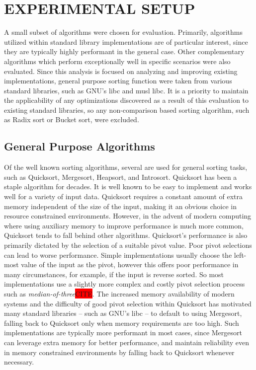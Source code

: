 \documentclass[letter, 12pt, conference]{ieeeconf}
\newcommand{\todocite}{\colorbox{red}{CITE}}
\begin{document}
\section{EXPERIMENTAL SETUP}

A small subset of algorithms were chosen for evaluation. Primarily, algorithms
utilized within standard library implementations are of particular interest,
since they are typically highly performant in the general case. Other
complementary algorithms which perform exceptionally well in specific scenarios
were also evaluated. Since this analysis is focused on analyzing and improving
existing implementations, general purpose sorting function were taken from
various standard libraries, such as GNU's libc\parencite{glibc} and musl
libc\parencite{musl_libc}. It is a priority to maintain the applicability of any
optimizations discovered as a result of this evaluation to existing standard
libraries, so any non-comparison based sorting algorithm, such as Radix sort or
Bucket sort, were excluded.

\subsection{General Purpose Algorithms}

Of the well known sorting algorithms, several are used for general sorting
tasks, such as Quicksort, Mergesort, Heapsort, and Introsort. Quicksort has been
a staple algorithm for decades. It is well known to be easy to implement and
works well for a variety of input data. Quicksort requires a constant amount of
extra memory independent of the size of the input, making it an obvious choice
in resource constrained environments. However, in the advent of modern computing
where using auxiliary memory to improve performance is much more common,
Quicksort tends to fall behind other algorithms. Quicksort's performance is also
primarily dictated by the selection of a suitable pivot value. Poor pivot
selections can lead to worse performance. Simple implementations usually choose
the left-most value of the input as the pivot, however this offers poor
performance in many circumstances, for example, if the input is reverse sorted.
So most implementations use a slightly more complex and costly pivot selection
process such as \textit{median-of-three}\todocite. The increased memory
availability of modern systems and the difficulty of good pivot selection within
Quicksort has motivated many standard libraries -- such as GNU's libc -- to
default to using Mergesort, falling back to Quicksort only when memory
requirements are too high\parencite{glibc}. Such implementations are typically
more performant in most cases, since Mergesort can leverage extra memory for
better performance, and maintain reliability even in memory constrained
environments by falling back to Quicksort whenever necessary.
\end{document}
